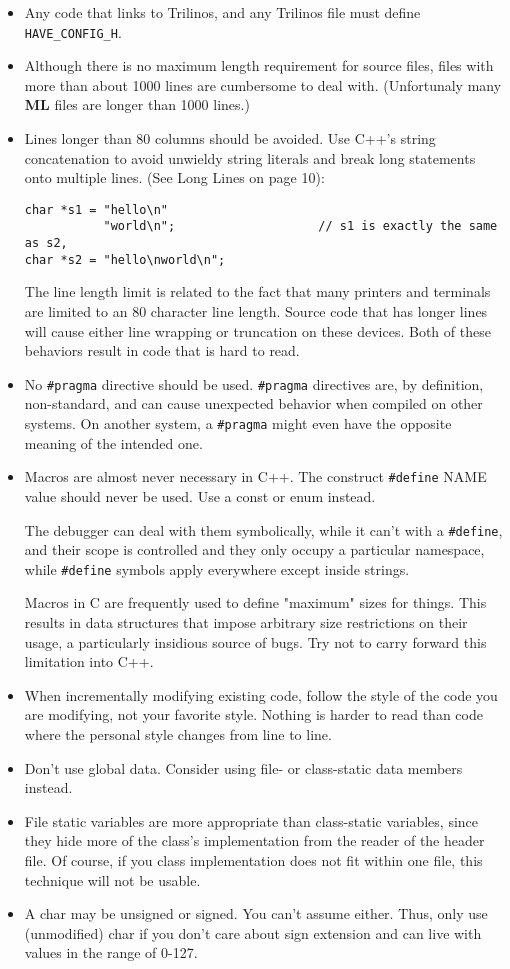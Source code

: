 \documentclass[10pt,letter,relax]{SANDreport}
\newcommand{\ML}     {{\bf ML }}
\begin{document}
\begin{itemize}
\item Any code that links to Trilinos, and any Trilinos file must define
  \verb!HAVE_CONFIG_H!.
\item Although there is no maximum length requirement for source files,
  files with more than about 1000 lines are cumbersome to deal
  with. (Unfortunaly many \ML files are longer than 1000 lines.)
\item Lines longer than 80 columns should be avoided. Use C++'s string
  concatenation to avoid unwieldy string literals and break long
  statements onto multiple lines. (See Long Lines on page 10):
\begin{verbatim}
char *s1 = "hello\n"
           "world\n";                    // s1 is exactly the same as s2,
char *s2 = "hello\nworld\n";
\end{verbatim}
The line length limit is related to the fact that many printers and
terminals are limited to an 80 character line length. Source code that
has longer lines will cause either line wrapping or truncation on these
devices. Both of these behaviors result in code that is hard to read.
\item No \verb!#pragma! directive should be used. \verb!#pragma!
  directives are, by definition, non-standard, and can cause unexpected
  behavior when compiled on other systems. On another system, a \verb!#pragma!
  might even have the opposite meaning of the intended one.
\item Macros are almost never necessary in C++.  The construct \verb!#define!
  NAME value should never be used. Use a const or enum instead.
  
  The debugger can deal with them symbolically, while it can't with a
  \verb!#define!, and their scope is controlled and they only occupy a
  particular namespace, while \verb!#define! symbols apply everywhere except
  inside strings.
  
  Macros in C are frequently used to define "maximum" sizes for things.
  This results in data structures that impose arbitrary size
  restrictions on their usage, a particularly insidious source of bugs.
  Try not to carry forward this limitation into C++.
\item When incrementally modifying existing code, follow the style of the code you are modifying, not your favorite style. Nothing is harder to read than code where the personal style changes from line to line.
\item Don't use global data. Consider using file- or class-static data members instead.
\item File static variables are more appropriate than class-static
  variables, since they hide more of the class's implementation from the
  reader of the header file. Of course, if you class implementation does
  not fit within one file, this technique will not be usable.
\item A char may be unsigned or signed. You can't assume either. Thus,
  only use (unmodified) char if you don't care about sign extension and
  can live with values in the range of 0-127.
\end{itemize}
\end{document}
